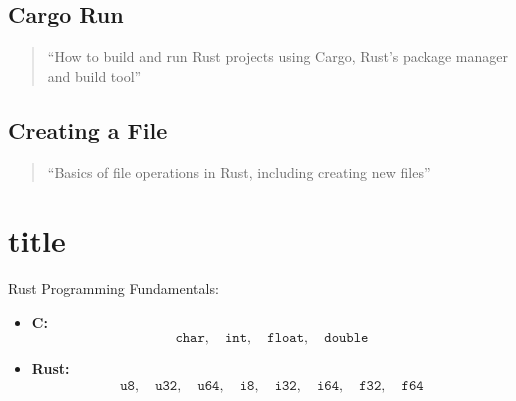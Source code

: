 \subsection{Cargo Run}
\begin{quote}
``How to build and run Rust projects using Cargo, Rust's package manager and build tool''
\end{quote}
\subsection{Creating a File}
\begin{quote}
``Basics of file operations in Rust, including creating new files''
\end{quote}

\newpage
\section{title}Rust Programming Fundamentals:

\newpage
\begin{itemize}
\item \textbf{C:} \[
\texttt{char},\quad \texttt{int},\quad \texttt{float},\quad \texttt{double}
\]
\item \textbf{Rust:} \begin{align*}
\texttt{u8},\quad \texttt{u32},\quad \texttt{u64},\quad \texttt{i8},\quad
\texttt{i32},\quad \texttt{i64},\quad \texttt{f32},\quad \texttt{f64}
\end{align*}
\end{itemize}
	
